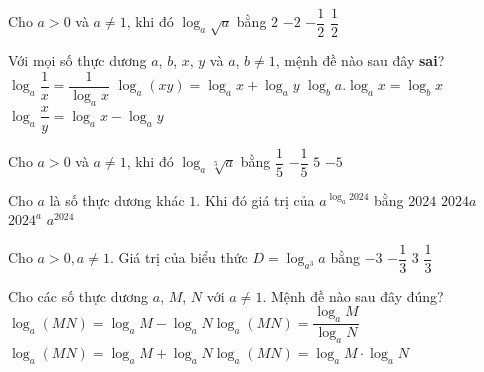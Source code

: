 \begin{ex}%
	Cho $a>0$ và $a\ne 1$, khi đó $\log_a\sqrt{a}$  bằng
	\choice 
		 {$2$}
		{$-2$} 
		{$-\dfrac{1}{2}$} 
		{\True $\dfrac{1}{2}$} 
\end{ex}

\begin{ex}%
	Với mọi số thực dương $a$, $b$, $x$, $y$ và $a$,  $b \ne 1$, mệnh đề nào sau đây \textbf{sai}?
	\choice 
		{\True $\log_{a}{\dfrac{1}{x}}=\dfrac{1}{\log_{a}{x}}$} 
		 {$\log_{a}(xy)=\log_{a}{x}+\log_{a}{y}$}
		{$\log_{b}{a}.\log_{a}{x}=\log_{b}{x}$} 
		{$\log_{a}{\dfrac{x}{y}}=\log_{a}{x}-\log_{a}{y}$} 
\end{ex}

\begin{ex}%
	 Cho $a > 0$ và $a \neq 1$, khi đó $\log _a \sqrt[5]{a}$ bằng
	 \choice
		 {\True $\dfrac{1}{5}$}
		{$-\dfrac{1}{5}$} 
		 {$5$}
		 {$-5$}
\end{ex}

\begin{ex}%
	Cho $ a $ là số thực dương khác $ 1 $. Khi đó giá trị  của $ a^{\log_a 2024}$ bằng
	\choice 
		 {\True $2024$}
		 {$2024a$}
		 {$2024^a$}
		{$a^{2024}$} 
\end{ex}

\begin{ex}%
	Cho $a > 0, a \neq 1$. Giá trị  của biểu thức $D=\log _{a^3} a$ bằng
	\choice 
		{$-3$} 
		 {$-\dfrac{1}{3}$}
		{$3$} 
		 {\True $\dfrac{1}{3}$}
\end{ex}

\begin{ex}%
	Cho các số thực dương $a$, $M$, $N$ với $a \ne 1$. Mệnh  đề nào sau đây đúng?
	 \choice
		{$\log_a(MN)=\log_a M-\log_a N$}{$\log_a(MN)=\dfrac{\log_a  M}{\log_a N}$}{\True $\log_a(MN)=\log_a M+\log_a N$}{$\log_a(MN)=\log_a M \cdot \log_a N$}
\end{ex}

